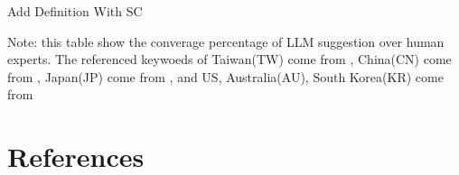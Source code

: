 \documentclass[11.5pt]{beamer}
\begin{document}
\begin{frame}{Add Definition With SC}
\begin{table}[H]
\renewcommand\arraystretch{1.4}
\begin{adjustwidth}{-0.0cm}{}
\begin{center}
\setlength{\tabcolsep}{10pt}
{
    \fontsize{12}{12} \selectfont
    
}
\end{center}
\end{adjustwidth}
{\tiny
    Note: this table show the converage percentage of LLM suggestion over
    human experts. The referenced keywoeds of Taiwan(TW) come from
    \cite{Chen2024}, China(CN) come from \cite{Huang2020}, Japan(JP) come from
    \cite{ArbatliSaxegaard2022}, and US, Australia(AU), South Korea(KR) come
    from \cite{Baker2016}
}
\end{table}
\end{frame}


\section{References}


\begin{frame}[allowframebreaks]{}
\renewcommand{\section}[2]{}%

\end{frame}
\end{document}

